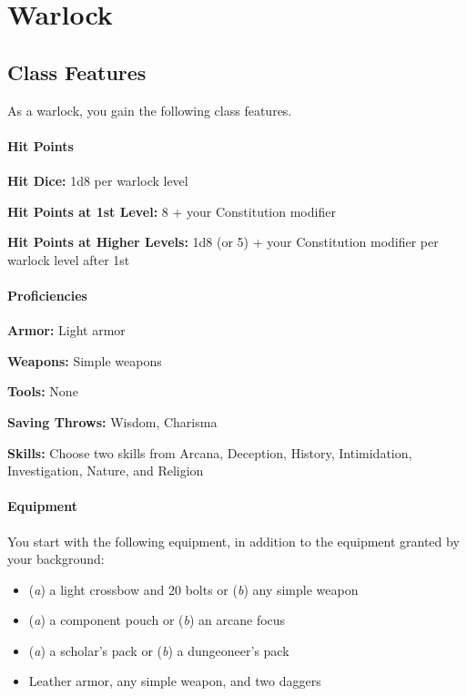 \documentclass[
]{article}
\date{}
\providecommand{\tightlist}{%
  \setlength{\itemsep}{0pt}\setlength{\parskip}{0pt}}
\begin{document}
\hypertarget{warlock}{%
\section{Warlock}\label{warlock}}

\hypertarget{class-features}{%
\subsection{Class Features}\label{class-features}}

As a warlock, you gain the following class features.

\hypertarget{hit-points}{%
\paragraph{Hit Points}\label{hit-points}}

\textbf{Hit Dice:} 1d8 per warlock level

\textbf{Hit Points at 1st Level:} 8 + your Constitution modifier

\textbf{Hit Points at Higher Levels:} 1d8 (or 5) + your Constitution
modifier per warlock level after 1st

\hypertarget{proficiencies}{%
\paragraph{Proficiencies}\label{proficiencies}}

\textbf{Armor:} Light armor

\textbf{Weapons:} Simple weapons

\textbf{Tools:} None

\textbf{Saving Throws:} Wisdom, Charisma

\textbf{Skills:} Choose two skills from Arcana, Deception, History,
Intimidation, Investigation, Nature, and Religion

\hypertarget{equipment}{%
\paragraph{Equipment}\label{equipment}}

You start with the following equipment, in addition to the equipment
granted by your background:

\begin{itemize}
\tightlist
\item
  (\emph{a}) a light crossbow and 20 bolts or (\emph{b}) any simple
  weapon
\item
  (\emph{a}) a component pouch or (\emph{b}) an arcane focus
\item
  (\emph{a}) a scholar's pack or (\emph{b}) a dungeoneer's pack
\item
  Leather armor, any simple weapon, and two daggers
\end{itemize}
\end{document}
